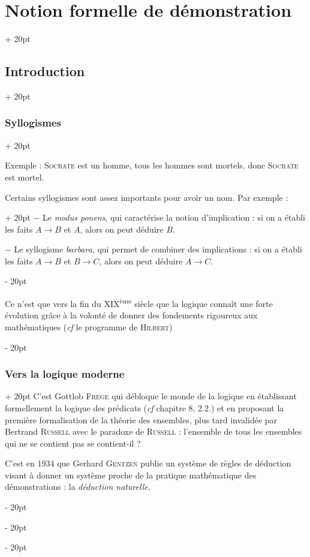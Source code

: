 \documentclass[a4paper, 12pt, twoside]{article}
\newcommand{\ind}[1][20pt]{\advance\leftskip + #1}
\newcommand{\deind}[1][20pt]{\advance\leftskip - #1}
\newenvironment{indt}[2][20pt]{#2 \par \ind[#1]}{\par \deind} %
\begin{document}
\begin{indt}{\section{Notion formelle de démonstration}}
\begin{indt}{\subsection{Introduction}}
\begin{indt}{\subsubsection{Syllogismes}}
                \vspace{12pt}
                
                Exemple : \textsc{Socrate} est un homme, tous les hommes sont mortels, donc \textsc{Socrate} est mortel.

                \vspace{12pt}
                
                \begin{indt}{Certains syllogismes sont assez importants pour avoir un nom. Par exemple :}
                    $-$ Le \emph{modus ponens}, qui caractérise la notion d'implication : si on a établi les faits $A \rightarrow B$ et $A$, alors on peut déduire $B$.

                    $-$ Le syllogisme \emph{barbara}, qui permet de combiner des implications : si on a établi les faits $A \rightarrow B$ et $B \rightarrow C$, alors on peut déduire $A \rightarrow C$.
                \end{indt}

                \vspace{6pt}
                
                Ce n'est que vers la fin du XIX\textsuperscript{ème} siècle que la logique connaît une forte évolution grâce à la volonté de donner des fondements rigoureux aux mathématiques (\textit{cf} le programme de \textsc{Hilbert})
            \end{indt}

            \vspace{12pt}
            
            \begin{indt}{\subsubsection{Vers la logique moderne}}
                C'est Gottlob \textsc{Frege} qui débloque le monde de la logique en établissant formellement la logique des prédicats (\textit{cf} chapitre 8, 2.2.) et en proposant la première formalisation de la théorie des ensembles, plus tard invalidée par Bertrand \textsc{Russell} avec le paradoxe de \textsc{Russell} : l'ensemble de tous les ensembles qui ne se contient pas se contient-il ?

                C'est en 1934 que Gerhard \textsc{Gentzen} publie un système de règles de déduction visant à donner un système proche de la pratique mathématique des démonstrations : la \emph{déduction naturelle}.


\end{indt}
\end{indt}
\end{indt}
\end{document}
